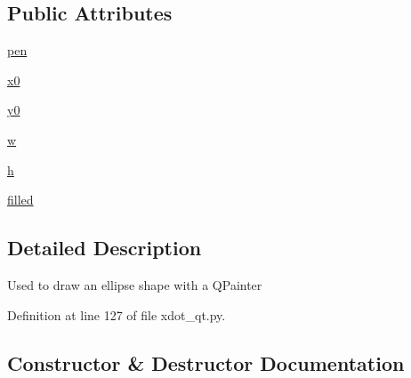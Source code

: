 \subsection*{Public Attributes}
\begin{DoxyCompactItemize}
\item 
\hyperlink{classsmacc__viewer_1_1xdot_1_1xdot__qt_1_1EllipseShape_a6423219aa041c492b80be25bd4f54753}{pen}
\item 
\hyperlink{classsmacc__viewer_1_1xdot_1_1xdot__qt_1_1EllipseShape_abdb288715129f85135c3e419a9e12959}{x0}
\item 
\hyperlink{classsmacc__viewer_1_1xdot_1_1xdot__qt_1_1EllipseShape_a614b6db830bef05d87ca2dd403401e11}{y0}
\item 
\hyperlink{classsmacc__viewer_1_1xdot_1_1xdot__qt_1_1EllipseShape_abce028ffaabc33b92349dc8ee873f7e1}{w}
\item 
\hyperlink{classsmacc__viewer_1_1xdot_1_1xdot__qt_1_1EllipseShape_af9e9fe2972e06665badea52e53685968}{h}
\item 
\hyperlink{classsmacc__viewer_1_1xdot_1_1xdot__qt_1_1EllipseShape_adb6b248e82c0cc5e2bf9338e7faa6196}{filled}
\end{DoxyCompactItemize}


\subsection{Detailed Description}
\begin{DoxyVerb}Used to draw an ellipse shape with a QPainter\end{DoxyVerb}
 

Definition at line 127 of file xdot\+\_\+qt.\+py.



\subsection{Constructor \& Destructor Documentation}
